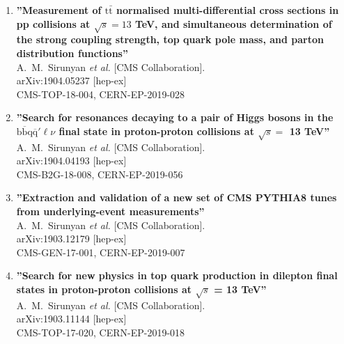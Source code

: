 \singlespacing
\begin{enumerate}
\item%
{\bf ''Measurement of $\mathrm{t\bar t}$ normalised multi-differential cross sections in pp collisions at $\sqrt s=13$ TeV, and simultaneous determination of the strong coupling strength, top quark pole mass, and parton distribution functions''}
  \\{}A.~M.~Sirunyan {\it et al.} [CMS Collaboration].
  \\{}arXiv:1904.05237 [hep-ex]
  \\{}CMS-TOP-18-004, CERN-EP-2019-028

\item%
{\bf ''Search for resonances decaying to a pair of Higgs bosons in the $\mathrm{b\overline{b}q\overline{q}'}\ell\nu$ final state in proton-proton collisions at $\sqrt{s}=$ 13 TeV''}
  \\{}A.~M.~Sirunyan {\it et al.} [CMS Collaboration].
  \\{}arXiv:1904.04193 [hep-ex]
  \\{}CMS-B2G-18-008, CERN-EP-2019-056

\item%
{\bf ''Extraction and validation of a new set of CMS PYTHIA8 tunes from underlying-event measurements''}
  \\{}A.~M.~Sirunyan {\it et al.} [CMS Collaboration].
  \\{}arXiv:1903.12179 [hep-ex]
  \\{}CMS-GEN-17-001, CERN-EP-2019-007

\item%
{\bf ''Search for new physics in top quark production in dilepton final states in proton-proton collisions at $\sqrt{s}$ = 13 TeV''}
  \\{}A.~M.~Sirunyan {\it et al.} [CMS Collaboration].
  \\{}arXiv:1903.11144 [hep-ex]
  \\{}CMS-TOP-17-020, CERN-EP-2019-018


\end{enumerate}
